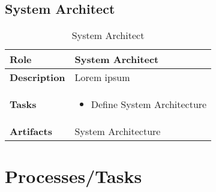 \subsection{System Architect} 
\begin{table}
	[!ht] \caption{System Architect} \label{table:ch6_Role_System_Architect} \centering 
	\begin{tabular}
		{|m{2cm}|m{10cm}|} \hline \bfseries Role & System Architect\\
		\hline \bfseries Description & Lorem ipsum\\
		\hline \bfseries Tasks & 
		\begin{itemize}
			\item Define System Architecture 
		\end{itemize}
		\\
		\hline \bfseries Artifacts & System Architecture\\
		\hline 
	\end{tabular}
\end{table}

\section{Processes/Tasks} 

